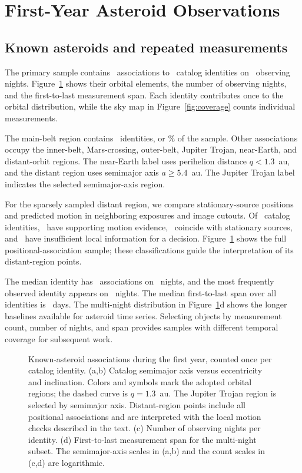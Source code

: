 \section{First-Year Asteroid Observations}
\label{sec:samples}

\subsection{Known asteroids and repeated measurements}
\label{sec:known_population}

The primary sample contains \yrNAssoc\ associations to
\yrNKnown\ catalog identities on \yrNKnownNights\ observing
nights. Figure~\ref{fig:orbits} shows their orbital elements,
the number of observing nights, and the first-to-last measurement
span. Each identity contributes once to the orbital distribution,
while the sky map in Figure~\ref{fig:coverage} counts individual
measurements.

The main-belt region contains \yrNMainBelt\ identities,
or \yrMainBeltFrac\% of the sample. Other associations occupy
the inner-belt, Mars-crossing, outer-belt, Jupiter Trojan,
near-Earth, and distant-orbit regions. The near-Earth label
uses perihelion distance $q<1.3$~au, and the distant region
uses semimajor axis $a\geq5.4$~au. The Jupiter Trojan label
indicates the selected semimajor-axis region.

For the sparsely sampled distant region, we compare stationary-source
positions and predicted motion in neighboring exposures and image
cutouts. Of \yrNDistant\ catalog identities, \yrNDistantMotion\
have supporting motion evidence, \yrNDistantStatic\ coincide with
stationary sources, and \yrNDistantUnresolved\ have insufficient
local information for a decision. Figure~\ref{fig:orbits} shows
the full positional-association sample; these classifications
guide the interpretation of its distant-region points.

The median identity has \yrMedAssoc\ associations on
\yrMedNights\ nights, and the most frequently observed identity
appears on \yrMaxNights\ nights. The median first-to-last span
over all identities is \yrMedBaseline~days. The multi-night
distribution in Figure~\ref{fig:orbits}d shows the longer
baselines available for asteroid time series. Selecting objects
by measurement count, number of nights, and span provides samples
with different temporal coverage for subsequent work.

\begin{figure}[tbp]
\centering
{}
\caption{Known-asteroid associations during the first year, counted
once per catalog identity. (a,b) Catalog semimajor axis versus
eccentricity and inclination. Colors and symbols mark the adopted
orbital regions; the dashed curve is $q=1.3$~au. The Jupiter Trojan
region is selected by semimajor axis. Distant-region points include
all positional associations and are interpreted with the local
motion checks described in the text. (c) Number of observing
nights per identity. (d) First-to-last measurement span for the
multi-night subset. The semimajor-axis scales in (a,b) and the
count scales in (c,d) are logarithmic.}
\label{fig:orbits}
\end{figure}

